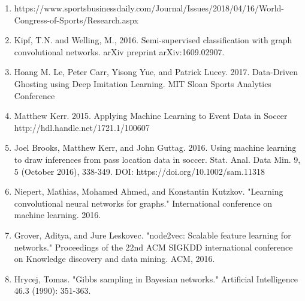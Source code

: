 \begin{enumerate}

\item https://www.sportsbusinessdaily.com/Journal/Issues/2018/04/16/World-Congress-of-Sports/Research.aspx 

\item Kipf, T.N. and Welling, M., 2016. Semi-supervised classification with graph convolutional networks. arXiv preprint         arXiv:1609.02907.

\item Hoang M. Le, Peter Carr, Yisong Yue, and Patrick Lucey. 2017. Data-Driven Ghosting using Deep Imitation Learning. MIT Sloan Sports Analytics Conference

\item Matthew Kerr. 2015. Applying Machine Learning to Event Data in Soccer    http://hdl.handle.net/1721.1/100607

\item Joel Brooks, Matthew Kerr, and John Guttag. 2016. Using machine learning to draw inferences from pass location data in soccer. Stat. Anal. Data Min. 9, 5 (October 2016), 338-349. DOI: https://doi.org/10.1002/sam.11318 

\item Niepert, Mathias, Mohamed Ahmed, and Konstantin Kutzkov. "Learning convolutional neural networks for graphs." International conference on machine learning. 2016.

\item Grover, Aditya, and Jure Leskovec. "node2vec: Scalable feature learning for networks." Proceedings of the 22nd ACM SIGKDD international conference on Knowledge discovery and data mining. ACM, 2016.

\item Hrycej, Tomas. "Gibbs sampling in Bayesian networks." Artificial Intelligence 46.3 (1990): 351-363.



\end{enumerate}
